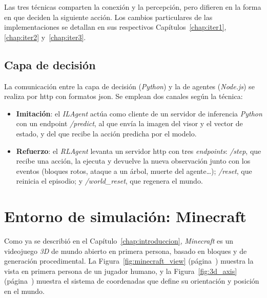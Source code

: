 Las tres técnicas comparten la conexión y la percepción, pero difieren en la forma en que deciden la siguiente
acción. Los cambios particulares de las implementaciones se detallan en sus respectivos
Capítulos~\ref{chap:iter1}, \ref{chap:iter2} y~\ref{chap:iter3}.

\subsection{Capa de decisión}
La comunicación entre la capa de decisión (\textit{Python}) y la de agentes (\textit{Node.js}) se
realiza por \acrshort{http} con formatos \acrshort{json}. Se emplean dos canales
según la técnica:

\begin{itemize}
    \item \textbf{Imitación}: el \textit{ILAgent} actúa como cliente de un servidor
        de inferencia \textit{Python} con un \gls{endpoint}
        \textit{/predict}, al que envía la imagen del visor y el vector de estado,
        y del que recibe la acción predicha por el modelo.
    \item \textbf{Refuerzo}: el \textit{RLAgent} levanta un servidor \acrshort{http}
        con tres \textit{endpoints}: \textit{/step}, que recibe una acción,
        la ejecuta y devuelve la nueva observación junto con los eventos
        (bloques rotos, ataque a un árbol, muerte del agente\ldots); \textit{/reset},
        que reinicia el episodio; y \textit{/world\_reset}, que regenera el mundo.
\end{itemize}

\section{Entorno de simulación: Minecraft}
Como ya se describió en el Capítulo~\ref{chap:introduccion}, \textit{Minecraft} es un videojuego
\textit{3D} de mundo abierto en primera persona, basado en bloques y de generación procedimental. La
Figura~\ref{fig:minecraft_view} (página~\pageref{fig:minecraft_view}) muestra la vista en primera persona de
un jugador humano, y la Figura~\ref{fig:3d_axis} (página~\pageref{fig:3d_axis}) muestra el sistema de coordenadas que define su
orientación y posición en el mundo.

